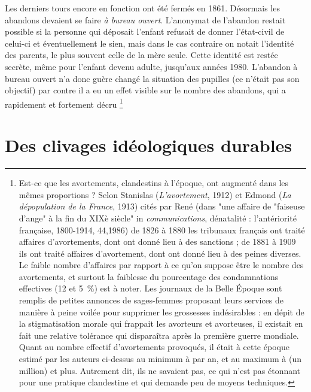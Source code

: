  Les derniers tours encore en fonction ont été fermés en 1861. Désormais les abandons devaient se faire \emph{à bureau ouvert}. L'anonymat de l'abandon restait possible si la personne qui déposait l'enfant refusait de donner l'état-civil de celui-ci et éventuellement le sien, mais dans le cas contraire on notait l'identité des parents, le plus souvent celle de la mère seule. Cette identité est restée secrète, même pour l'enfant devenu adulte, jusqu'aux années 1980. L'abandon à bureau ouvert n'a donc guère changé la situation des pupilles (ce n'était pas son objectif) par contre il a eu un effet visible sur le nombre des abandons, qui a rapidement et fortement décru%
\footnote{Est-ce que les avortements, clandestins à l'époque, ont augmenté dans les mêmes proportions ? Selon Stanislas  (\emph{L'avortement}, 1912) et Edmond  (\emph{La dépopulation de la France}, 1913) cités par René  (dans "une affaire de "faiseuse d'ange" à la fin du XIXè siècle" in \emph{communications}, dénatalité : l'antériorité française, 1800-1914, 44,1986) de 1826 à 1880 les tribunaux français ont traité  affaires d'avortements, dont  ont donné lieu à des sanctions ; de 1881 à 1909 ils ont traité  affaires d'avortement, dont  ont donné lieu à des peines diverses. Le faible nombre d'affaires par rapport à ce qu'on suppose être le nombre des avortements, et surtout la faiblesse du pourcentage des condamnations effectives (12 et 5~\%) est à noter. Les journaux de la Belle Époque sont remplis de petites annonces de sages-femmes proposant leurs services de manière à peine voilée pour supprimer les grossesses indésirables : en dépit de la stigmatisation morale qui frappait les avorteurs et avorteuses, il existait en fait une relative tolérance qui disparaîtra après la première guerre mondiale. Quant au nombre effectif d'avortements provoqués, il était à cette époque estimé par les auteurs ci-dessus au minimum à  par an, et au maximum à  (un million) et plus. Autrement dit, ils ne savaient pas, ce qui n'est pas étonnant pour une pratique clandestine et qui demande peu de moyens techniques.}%


\section{Des clivages idéologiques durables}

